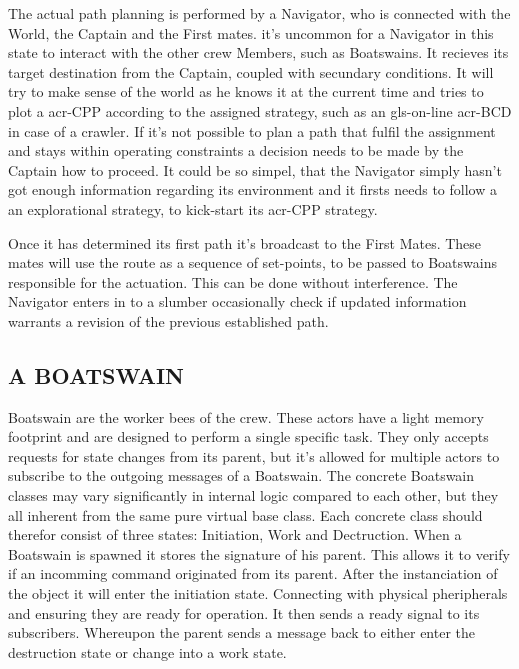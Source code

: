 The actual path planning is performed by a Navigator, who is connected with the World, the Captain and the First mates.
it's uncommon for a Navigator in this state to interact with the other crew Members, such as Boatswains. It recieves
its target destination from the Captain, coupled with secundary conditions. It will try to make sense of the world as he
knows it at the current time and tries to plot a \gls{acr-CPP} according to the assigned strategy, such as an
\gls{gls-on-line} \gls{acr-BCD} in case of a crawler. If it's not possible to plan a path that fulfil the assignment
and stays within operating constraints a decision needs to be made by the Captain how to proceed. It could be so simpel,
that the Navigator simply hasn't got enough information regarding its environment and it firsts needs to follow a an
explorational strategy, to kick-start its \gls{acr-CPP} strategy.

Once it has determined its first path it's broadcast to the First Mates. These mates will use the route as a sequence
of set-points, to be passed to Boatswains responsible for the actuation. This can be done without interference. The
Navigator enters in to a slumber occasionally check if updated information warrants a revision of the previous
established path.

\subsection{A BOATSWAIN}\label{seq:a boatswain}

Boatswain are the worker bees of the crew. These actors have a light memory footprint and are designed to perform a
single specific task. They only accepts requests for state changes from its parent, but it's allowed for multiple
actors to subscribe to the outgoing messages of a Boatswain. The concrete Boatswain classes may vary significantly in
internal logic compared to each other, but they all inherent from the same pure virtual base class. Each concrete class
should therefor consist of three states: Initiation, Work and Dectruction. When a Boatswain is spawned it stores the
signature of his parent. This allows it to verify if an incomming command originated from its parent. After the
instanciation of the object it will enter the initiation state. Connecting with physical pheripherals and ensuring they
are ready for operation. It then sends a ready signal to its subscribers. Whereupon the parent sends a message back to
either enter the destruction state or change into a work state.

